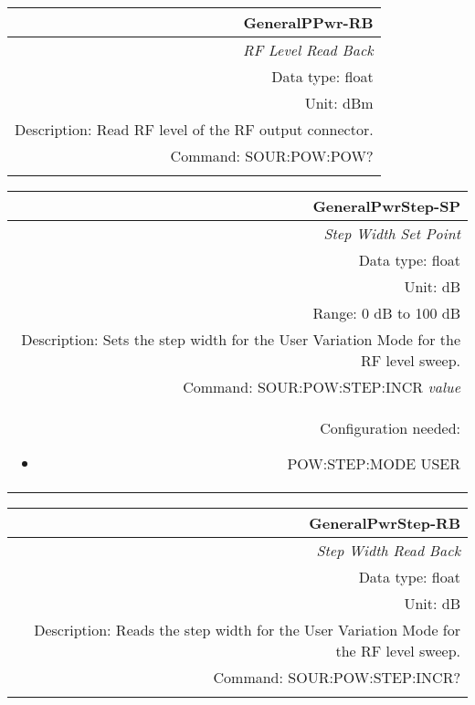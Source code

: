 \documentclass[openany]{article}
\begin{document}
		\begin{tabular}{N}
			\hline
			\bfseries GeneralPPwr-RB \\ \hline
			\emph{RF Level Read Back} \\
			Data type: float \\
			Unit: dBm \\
			Description: Read RF level of the RF output connector. \\
			Command: SOUR:POW:POW? \\
			\\

		\end{tabular}


		\begin{tabular}{N}
			\hline
			\bfseries GeneralPwrStep-SP \\ \hline
			\emph{Step Width Set Point} \\
			Data type: float \\
			Unit: dB \\
			Range: 0 dB to 100 dB \\
			Description: Sets the step width for the User Variation Mode for the RF level sweep. \\
			Command: SOUR:POW:STEP:INCR \emph{value} \\
			Configuration needed: \begin{itemize}[noitemsep]
				\small
				\item[] POW:STEP:MODE USER
			\end{itemize} \\

		\end{tabular}


		\begin{tabular}{N}
			\hline
			\bfseries GeneralPwrStep-RB \\ \hline
			\emph{Step Width Read Back} \\
			Data type: float \\
			Unit: dB \\
			Description: Reads the step width for the User Variation Mode for the RF level sweep. \\
			Command: SOUR:POW:STEP:INCR? \\
			\\

		\end{tabular}
\end{document}
